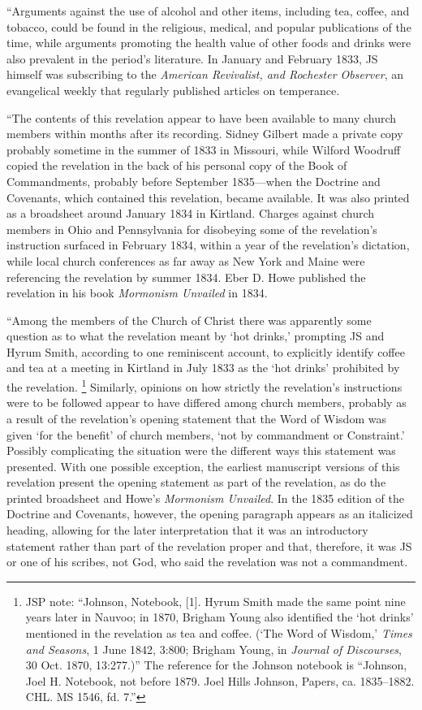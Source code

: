 			``Arguments against the use of alcohol and other items, including tea, coffee, and tobacco, could be found in the religious, medical, and popular publications of the time, while arguments promoting the health value of other foods and drinks were also prevalent in the period's literature. In January and February 1833, JS himself was subscribing to the \textit{American Revivalist, and Rochester Observer}, an evangelical weekly that regularly published articles on temperance.

			``The contents of this revelation appear to have been available to many church members within months after its recording. Sidney Gilbert made a private copy probably sometime in the summer of 1833 in Missouri, while Wilford Woodruff copied the revelation in the back of his personal copy of the Book of Commandments, probably before September 1835---when the Doctrine and Covenants, which contained this revelation, became available. It was also printed as a broadsheet around January 1834 in Kirtland. Charges against church members in Ohio and Pennsylvania for disobeying some of the revelation's instruction surfaced in February 1834, within a year of the revelation's dictation, while local church conferences as far away as New York and Maine were referencing the revelation by summer 1834. Eber D. Howe published the revelation in his book \textit{Mormonism Unvailed} in 1834.

			``Among the members of the Church of Christ there was apparently some question as to what the revelation meant by `hot drinks,' prompting JS and Hyrum Smith, according to one reminiscent account, to explicitly identify coffee and tea at a meeting in Kirtland in July 1833 as the `hot drinks' prohibited by the revelation.%
				\footnote{%
					JSP note: ``Johnson, Notebook, [1]. Hyrum Smith made the same point nine years later in Nauvoo; in 1870, Brigham Young also identified the `hot drinks' mentioned in the revelation as tea and coffee. (`The Word of Wisdom,' \textit{Times and Seasons}, 1 June 1842, 3:800; Brigham Young, in \textit{Journal of Discourses}, 30 Oct. 1870, 13:277.)'' The reference for the Johnson notebook is ``Johnson, Joel H. Notebook, not before 1879. Joel Hills Johnson, Papers, ca. 1835--1882. CHL. MS 1546, fd. 7.''
					}
			Similarly, opinions on how strictly the revelation's instructions were to be followed appear to have differed among church members, probably as a result of the revelation's opening statement that the Word of Wisdom was given `for the benefit' of church members, `not by commandment or Constraint.' Possibly complicating the situation were the different ways this statement was presented. With one possible exception, the earliest manuscript versions of this revelation present the opening statement as part of the revelation, as do the printed broadsheet and Howe's \textit{Mormonism Unvailed}. In the 1835 edition of the Doctrine and Covenants, however, the opening paragraph appears as an italicized heading, allowing for the later interpretation that it was an introductory statement rather than part of the revelation proper and that, therefore, it was JS or one of his scribes, not God, who said the revelation was not a commandment.

